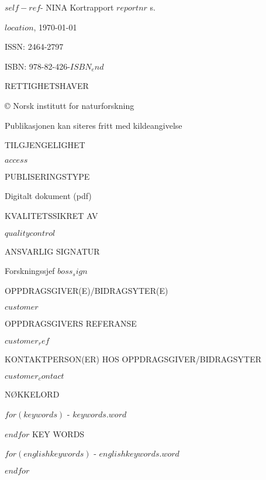 \documentclass[11pt, a4paper]{article}
\newcommand{\smallspace}{\vspace{3mm}}
\begin{document}
\footnotesize{$self-ref$}- NINA Kortrapport $reportnr$ \pageref{LastPage} s. \par \smallspace
$location$, \ninadate\today \par \smallspace
ISSN: 2464-2797 \par
ISBN: 978-82-426-$ISBN_end$ \par  \smallspace
{\footnotesize{RETTIGHETSHAVER}} \par
© Norsk institutt for naturforskning  \par
Publikasjonen kan siteres fritt med kildeangivelse \par \smallspace
{\footnotesize{TILGJENGELIGHET}} \par
$access$ \par \smallspace
{\footnotesize{PUBLISERINGSTYPE}} \par
Digitalt dokument (pdf) \par \smallspace
{\footnotesize{KVALITETSSIKRET AV}} \par
$qualitycontrol$ \par \smallspace
{\footnotesize{ANSVARLIG SIGNATUR}} \par
Forskningssjef $boss_sign$ \par \smallspace
{\footnotesize{OPPDRAGSGIVER(E)/BIDRAGSYTER(E)}} \par
$customer$ \par \smallspace
{\footnotesize{OPPDRAGSGIVERS REFERANSE}} \par
$customer_ref$ \par \smallspace
{\footnotesize{KONTAKTPERSON(ER) HOS OPPDRAGSGIVER/BIDRAGSYTER}} \par
$customer_contact$ \par \smallspace
{\footnotesize{NØKKELORD}} \par\smallskip
$for(keywords)$
\small{\hyp{} $keywords.word$} \par
$endfor$
\vspace{5mm}
KEY WORDS \par\smallskip
$for(englishkeywords)$
\small{\hyp{} $englishkeywords.word$} \par
$endfor$

\vfill
\footnotesize
\end{document}
